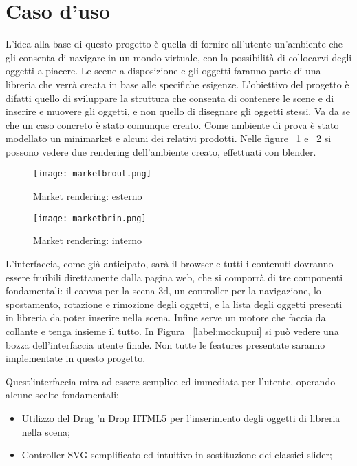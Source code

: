 \section{Caso d'uso}
L'idea alla base di questo progetto è quella di fornire all'utente un'ambiente che gli consenta di navigare in un mondo virtuale, con la possibilità di collocarvi degli oggetti a piacere. Le scene a disposizione e gli oggetti faranno parte di una libreria che verrà creata in base alle specifiche esigenze. L'obiettivo del progetto è difatti quello di sviluppare la struttura che consenta di contenere le scene e di inserire e muovere gli oggetti, e non quello di disegnare gli oggetti stessi. Va da se che un caso concreto è stato comunque creato. Come ambiente di prova è stato modellato un minimarket e alcuni dei relativi prodotti. Nelle figure ~\ref{label:marketbrout} e ~\ref{label:marketbrin} si possono vedere due rendering dell'ambiente creato, effettuati con blender.

\begin{figure}[Ht]
\centering
\texttt{[image: marketbrout.png]}
\caption{Market rendering: esterno}
\label{label:marketbrout}
\end{figure}

\begin{figure}[Ht]
\centering
\texttt{[image: marketbrin.png]}
\caption{Market rendering: interno}
\label{label:marketbrin}
\end{figure}

L'interfaccia, come già anticipato, sarà il browser e tutti i contenuti dovranno essere fruibili direttamente dalla pagina web, che si comporrà di tre componenti fondamentali: il canvas per la scena 3d, un controller per la navigazione, lo spostamento, rotazione e rimozione degli oggetti, e la lista degli oggetti presenti in libreria da poter inserire nella scena. Infine serve un motore che faccia da collante e tenga insieme il tutto. In Figura ~\ref{label:mockupui} si può vedere una bozza dell'interfaccia utente finale. Non tutte le features presentate saranno implementate in questo progetto. 

Quest'interfaccia mira ad essere semplice ed immediata per l'utente, operando alcune scelte fondamentali:
\begin{itemize}
    \item Utilizzo del Drag 'n Drop HTML5 per l'inserimento degli oggetti di libreria nella scena;
    \item Controller SVG semplificato ed intuitivo in sostituzione dei classici slider;
\end{itemize}

